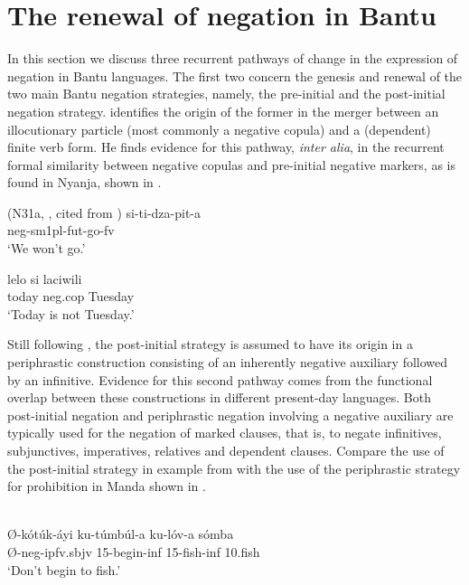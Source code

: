 \documentclass[output=paper,draft,draftmode,colorlinks,citecolor=brown]{langscibook}
\begin{document}
\section{The renewal of negation in Bantu}\label{sec:1:2} In this section
we discuss three recurrent pathways of change in the expression of negation
in Bantu languages. The first two concern the genesis and renewal of the
two main Bantu negation strategies, namely, the pre-initial and the
post-initial negation strategy. \citet{Guldemann1996,Guldemann1999}
identifies the origin of the former in the merger between an illocutionary
particle (most commonly a negative copula) and a (dependent) finite verb
form. He finds evidence for this pathway, {\it inter alia}, in the
recurrent formal similarity between negative copulas and pre-initial
negative markers, as is found in Nyanja, shown in .

\ea\label{ex:nyanja-go-tuesday}
 (N31a, \citealt[174]{StevickHollander1965}, cited from \citealt[568]{Guldemann1999})
\ea\label{ex:nyanja-go}
\gll
si-ti-dza-pit-a\\ {\sc neg-sm1pl}-{\sc fut}-go-{\sc fv}\\
\glt `We won't go.'

\ex\label{ex:nyanja-tuesday}
\gll lelo si laciwili\\ today {\sc
neg.cop} Tuesday\\
\glt `Today is not Tuesday.’
\z
\z



Still following
\citet{Guldemann1996,Guldemann1999}, the post-initial strategy is assumed
to have its origin in a periphrastic construction consisting of an
inherently negative auxiliary followed by an infinitive. Evidence for this
second pathway comes from the functional overlap between these
constructions in different present-day languages. Both post-initial
negation and periphrastic negation involving a negative auxiliary are
typically used for the negation of marked clauses, that is, to negate
infinitives, subjunctives, imperatives, relatives and dependent clauses.
Compare the use of the post-initial strategy in example 
from  with the use of the periphrastic strategy for prohibition in
Manda shown in .

\ea\label{ex:manda-fish}
\\
\gll Ø-kótúk-áyi
ku-túmbúl-a ku-lóv-a sómba\\ Ø-{\sc neg-ipfv.sbjv} 15-begin-{\sc inf}
15-fish-{\sc inf} 10.fish\\
\glt `Don't begin to fish.'
\z
\end{document}
